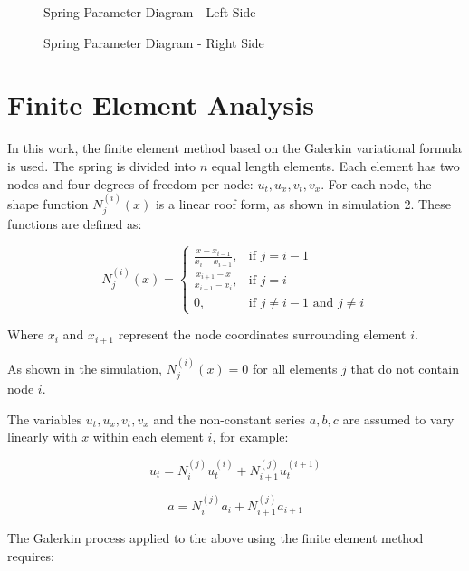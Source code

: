 \documentclass{mcmthesis}  %
\begin{document}
\begin{appendices}
\begin{figure}[h!]
    \centering
    \caption{Spring Parameter Diagram - Left Side}
    \label{fig:spring_params_left}
\end{figure}

\begin{figure}[h!]
    \centering
    \caption{Spring Parameter Diagram - Right Side}
    \label{fig:spring_params_right}
\end{figure}

\section{Finite Element Analysis}  %

In this work, the finite element method based on the Galerkin variational formula is used. The spring is divided into $n$ equal length elements. Each element has two nodes and four degrees of freedom per node: $u_t, u_x, v_t, v_x$. For each node, the shape function $N_j^{(i)}(x)$ is a linear roof form, as shown in simulation 2. These functions are defined as:

\begin{equation}
N_j^{(i)}(x) = 
\begin{cases}
\frac{x-x_{i-1}}{x_i-x_{i-1}}, & \text{if } j = i-1 \\
\frac{x_{i+1}-x}{x_{i+1}-x_i}, & \text{if } j = i \\
0, & \text{if } j \neq i-1 \text{ and } j \neq i
\end{cases}
\end{equation}

Where $x_i$ and $x_{i+1}$ represent the node coordinates surrounding element $i$.

As shown in the simulation, $N_j^{(i)}(x) = 0$ for all elements $j$ that do not contain node $i$.

The variables $u_t, u_x, v_t, v_x$ and the non-constant series $a, b, c$ are assumed to vary linearly with $x$ within each element $i$, for example:

\begin{equation}
u_t = N_i^{(j)}u_t^{(i)} + N_{i+1}^{(j)}u_t^{(i+1)}
\end{equation}

\begin{equation}
a = N_i^{(j)}a_i + N_{i+1}^{(j)}a_{i+1}
\end{equation}

The Galerkin process applied to the above using the finite element method requires:


\end{appendices}
\end{document}
